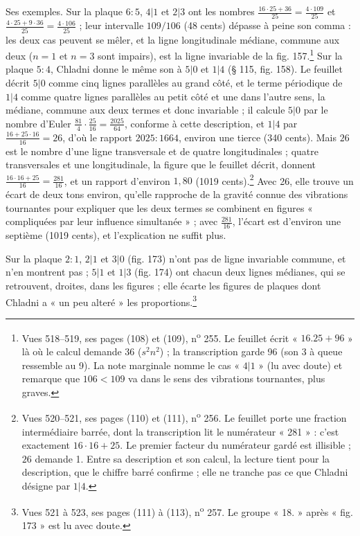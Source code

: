\documentclass[11pt,a4paper]{article}
\begin{document}
Ses exemples. Sur la plaque $6:5$, $4|1$ et $2|3$ ont les nombres
$\frac{16\cdot25+36}{25} = \frac{4\cdot109}{25}$ et
$\frac{4\cdot25+9\cdot36}{25} = \frac{4\cdot106}{25}$ ; leur intervalle
$109/106$ (48 cents) dépasse à peine son comma : les deux cas peuvent se
mêler, et la ligne longitudinale médiane, commune aux deux ($n = 1$ et $n = 3$
sont impairs), est la ligne invariable de la fig. 157.\footnote{Vues 518--519, ses
pages (108) et (109), n\textsuperscript{o} 255. Le feuillet écrit « $16.25+96$ »
là où le calcul demande $36$ ($s^2n^2$) ; la transcription garde 96 (son 3 à
queue ressemble au 9). La note marginale nomme le cas « $4|1$ » (lu avec doute)
et remarque que $106 < 109$ va dans le sens des vibrations tournantes, plus
graves.} Sur la plaque $5:4$, Chladni donne le même son à $5|0$ et $1|4$
(§ 115, fig. 158). Le feuillet décrit $5|0$ comme cinq lignes parallèles au grand
côté, et le terme périodique de $1|4$ comme quatre lignes parallèles au petit
côté et une dans l'autre sens, la médiane, commune aux deux termes et donc
invariable ; il calcule $5|0$ par le nombre d'Euler $\frac{81}{4}\cdot\frac{25}{16}
= \frac{2025}{64}$, conforme à cette description, et $1|4$ par
$\frac{16+25\cdot16}{16} = 26$, d'où le rapport $2025:1664$, environ une tierce
(340 cents). Mais $26$ est le nombre d'une ligne transversale et de quatre
longitudinales ; quatre transversales et une longitudinale, la figure que le
feuillet décrit, donnent $\frac{16\cdot16+25}{16} = \frac{281}{16}$, et un
rapport d'environ $1{,}80$ (1019 cents).\footnote{Vues 520--521, ses pages (110)
et (111), n\textsuperscript{o} 256. Le feuillet porte une fraction
intermédiaire barrée, dont la transcription lit le numérateur « 281 » : c'est
exactement $16\cdot16+25$. Le premier facteur du numérateur gardé est
illisible ; $26$ demande 1. Entre sa description et son calcul, la lecture
tient pour la description, que le chiffre barré confirme ; elle ne tranche pas
ce que Chladni désigne par $1|4$.} Avec 26, elle trouve un écart de deux tons
environ, qu'elle rapproche de la gravité connue des vibrations tournantes pour
expliquer que les deux termes se combinent en figures « compliquées par leur
influence simultanée » ; avec $\frac{281}{16}$, l'écart est d'environ une
septième (1019 cents), et l'explication ne suffit plus.

Sur la plaque $2:1$, $2|1$ et $3|0$ (fig. 173) n'ont pas de ligne invariable
commune, et n'en montrent pas ; $5|1$ et $1|3$ (fig. 174) ont chacun deux
lignes médianes, qui se retrouvent, droites, dans les figures ; elle écarte les
figures de plaques dont Chladni a « un peu alteré » les
proportions.\footnote{Vues 521 à 523, ses pages (111) à (113),
n\textsuperscript{o} 257. Le groupe « 18. » après « fig. 173 » est lu avec
doute.}
\end{document}

